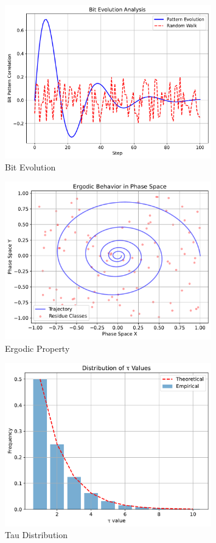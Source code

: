 \begin{figure}[ht]
\centering
\includegraphics[width=0.8\textwidth]{figures/bit_evolution.pdf}
\caption{Bit Evolution}
\label{fig:bit_evolution_intro}
\end{figure}

\begin{figure}[ht]
\centering
\includegraphics[width=0.8\textwidth]{figures/ergodic_property.pdf}
\caption{Ergodic Property}
\label{fig:ergodic_property_intro}
\end{figure}

\begin{figure}[ht]
\centering
\includegraphics[width=0.8\textwidth]{figures/tau_distribution.pdf}
\caption{Tau Distribution}
\label{fig:tau_distribution_intro}
\end{figure}

